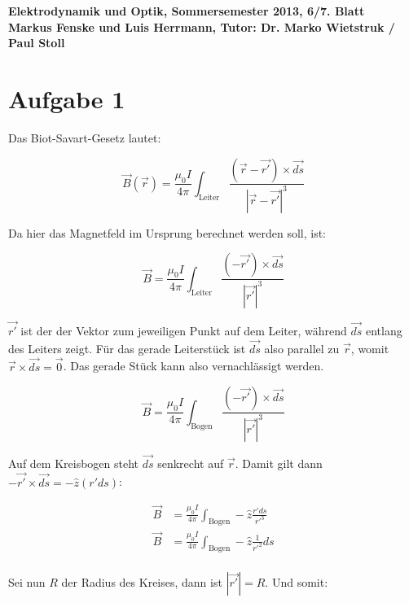 \documentclass[a4paper,german,12pt,smallheadings]{scrartcl}
\begin{document}
\begin{center}
\bfseries %
\sffamily %
\vspace{-40pt}
Elektrodynamik und Optik, Sommersemester 2013, 6/7. Blatt \\
Markus Fenske und Luis Herrmann, Tutor: Dr. Marko Wietstruk / Paul Stoll
\vspace{-10pt}
\end{center}
\section*{Aufgabe 1}
Das Biot-Savart-Gesetz lautet:

\begin{equation}
  \vec{B}(\vec{r}) = \frac{\mu_0 I}{4 \pi} \int_{\text{Leiter}} \frac{(\vec{r} - \vec{r'}) \times \vec{ds}}{|\vec{r}-\vec{r'}|^3}
\end{equation}

Da hier das Magnetfeld im Ursprung berechnet werden soll, ist:


\begin{equation}
  \vec{B} = \frac{\mu_0 I}{4 \pi} \int_{\text{Leiter}} \frac{(-\vec{r'}) \times \vec{ds}}{|\vec{r'}|^3}
\end{equation}

$\vec{r'}$ ist der der Vektor zum jeweiligen Punkt auf dem Leiter, während
$\vec{ds}$ entlang des Leiters zeigt. Für das gerade Leiterstück ist $\vec{ds}$
also parallel zu $\vec{r}$, womit $\vec{r} \times \vec{ds} = \vec{0}$. Das
gerade Stück kann also vernachlässigt werden.

\begin{equation}
  \vec{B} = \frac{\mu_0 I}{4 \pi} \int_{\text{Bogen}} \frac{(-\vec{r'}) \times \vec{ds}}{|\vec{r'}|^3}
\end{equation}

Auf dem Kreisbogen steht $\vec{ds}$ senkrecht auf $\vec{r}$. Damit gilt dann
$-\vec{r'} \times \vec{ds} = -\widehat{z} (r' ds)$:

\begin{align}
  \vec{B} &= \frac{\mu_0 I}{4 \pi} \int_{\text{Bogen}} -\widehat{z} \frac{r' ds}{r'^3} \\
  \vec{B} &= \frac{\mu_0 I}{4 \pi} \int_{\text{Bogen}} -\widehat{z} \frac{1}{r'^2} ds \\
\end{align}

Sei nun $R$ der Radius des Kreises, dann ist $|\vec{r'}| = R$. Und somit:
\end{document}
